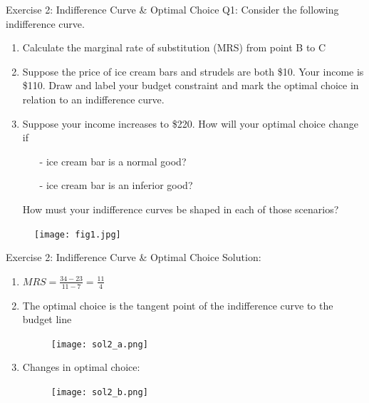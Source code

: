 \documentclass[9pt, handout]{beamer}
\begin{document}
\begin{frame}{Exercise 2: Indifference Curve \& Optimal Choice}
    Q1: Consider the following indifference curve.
    \begin{enumerate}
        \item Calculate the marginal rate of substitution (MRS) from point B to C
        \item Suppose the price of ice cream bars and strudels are both \$10. Your income is \$110. Draw and label your budget constraint and mark the optimal choice in relation to an indifference curve. 
        \item Suppose your income increases to \$220. How will your optimal choice change if 
        \begin{itemize}
            \item[-] ice cream bar is a normal good?
            \item[-] ice cream bar is an inferior good? 
        \end{itemize}
        How must your indifference curves be shaped in each of those scenarios?
    \end{enumerate}
    \begin{figure}
        \centering
        \texttt{[image: fig1.jpg]}
    \end{figure}
\end{frame}

\begin{frame}{Exercise 2: Indifference Curve \& Optimal Choice}
    Solution: 
    \begin{enumerate}
        \item $MRS=\frac{34-23}{11-7}=\frac{11}{4}$
        \item The optimal choice is the tangent point of the indifference curve to the budget line 
        \begin{figure}
            \centering
            \texttt{[image: sol2\_a.png]}
        \end{figure}
        \item Changes in optimal choice: 
        \begin{figure}[h!]
            \centering
            \texttt{[image: sol2\_b.png]}
        \end{figure}
    \end{enumerate}
\end{frame}
\end{document}
